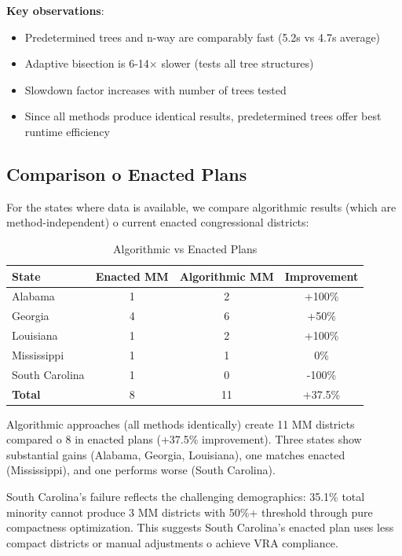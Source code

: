 \textbf{Key observations}:
\begin{itemize}
\item Predetermined trees and n-way are comparably fast (5.2s vs 4.7s average)
\item Adaptive bisection is 6-14× slower (tests all tree structures)
\item Slowdown factor increases with number of trees tested
\item Since all methods produce identical results, predetermined trees offer best runtime efficiency
\end{itemize}

\subsection{Comparison 	o Enacted Plans}

For the states where data is available, we compare algorithmic results (which are method-independent) 	o current enacted congressional districts:

\begin{table}[h]
\centering
\caption{Algorithmic vs Enacted Plans}
\label{tab:enacted_comparison}
\begin{tabular}{lccc}
\toprule
\textbf{State} & \textbf{Enacted MM} & \textbf{Algorithmic MM} & \textbf{Improvement} \\
\midrule
Alabama & 1 & 2 & +100\% \\
Georgia & 4 & 6 & +50\% \\
Louisiana & 1 & 2 & +100\% \\
Mississippi & 1 & 1 & 0\% \\
South Carolina & 1 & 0 & -100\% \\
\midrule
\textbf{Total} & 8 & 11 & +37.5\% \\
\bottomrule
\end{tabular}
\end{table}

Algorithmic approaches (all methods identically) create 11 MM districts compared 	o 8 in enacted plans (+37.5\% improvement). Three states show substantial gains (Alabama, Georgia, Louisiana), one matches enacted (Mississippi), and one performs worse (South Carolina).

South Carolina's failure reflects the challenging demographics: 35.1\% total minority cannot produce 3 MM districts with 50\%+ threshold through pure compactness optimization. This suggests South Carolina's enacted plan uses less compact districts or manual adjustments 	o achieve VRA compliance.

